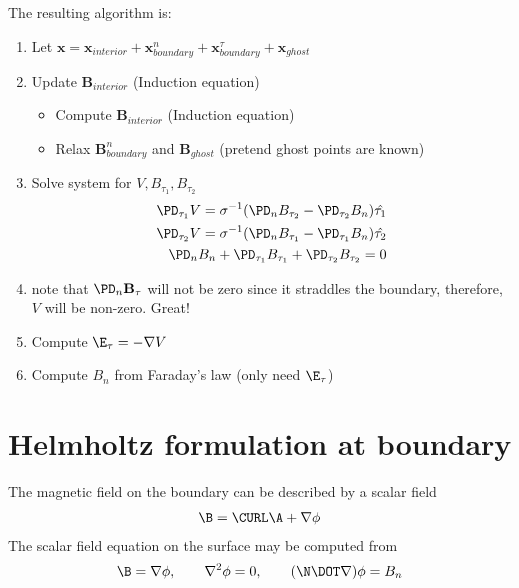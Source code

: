 \documentclass[11pt]{article}
\begin{document}
The resulting algorithm is:

\begin{enumerate}
\setlength\itemsep{-1em}
\item Let $\mathbf{x}=\mathbf{x}_{interior}+\mathbf{x}_{boundary}^{n}+\mathbf{x}_{boundary}^{\tau}+\mathbf{x}_{ghost}$
\item Update $\mathbf{B}_{interior}$ (Induction equation)
\begin{itemize}
\setlength\itemsep{-1em}
\item Compute $\mathbf{B}_{interior}$ (Induction equation)
\item Relax $\mathbf{B}_{boundary}^n$ and $\mathbf{B}_{ghost}$ (pretend ghost points are known)
\end{itemize}
\item Solve system for $V,B_{\tau_1},B_{\tau_2}$
\begin{equation}\begin{aligned}
  \PD_{\tau_1} V = \sigma^{-1}(\PD_n B_{\tau_2} - \PD_{\tau_2} B_n) \hat{\tau_1} \\
  \PD_{\tau_2} V = \sigma^{-1} (\PD_n B_{\tau_1} - \PD_{\tau_1} B_n) \hat{\tau_2} \\
  \PD_n B_n + \PD_{\tau_1} B_{\tau_1} + \PD_{\tau_2} B_{\tau_2} = 0
\end{aligned}\end{equation}
\item note that $\PD_n \mathbf{B}_{\tau}$ will not be zero since it straddles the boundary, therefore, $V$ will be non-zero. Great!
\item Compute $\E_{\tau} = -\nabla V$
\item Compute $B_{n}$ from Faraday's law (only need $\E_{\tau}$)
\end{enumerate}
\newpage
\section{Helmholtz formulation at boundary}
The magnetic field on the boundary can be described by a scalar field
\begin{equation} \begin{aligned}
\B = \CURL \A + \nabla \phi
\end{aligned} \end{equation}
The scalar field equation on the surface may be computed from
\begin{equation} \begin{aligned}
\B = \nabla \phi, \qquad \nabla^2 \phi = 0, \qquad (\N \DOT \nabla) \phi = B_n
\end{aligned} \end{equation}
\end{document}
